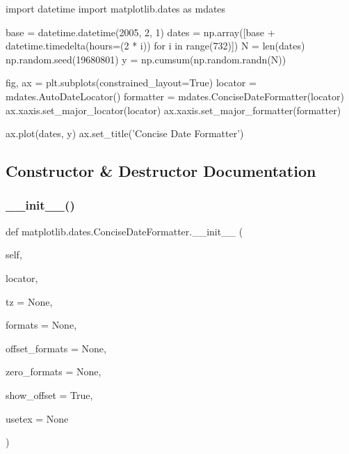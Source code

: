 \begin{DoxyVerb}
    import datetime
    import matplotlib.dates as mdates

    base = datetime.datetime(2005, 2, 1)
    dates = np.array([base + datetime.timedelta(hours=(2 * i))
                      for i in range(732)])
    N = len(dates)
    np.random.seed(19680801)
    y = np.cumsum(np.random.randn(N))

    fig, ax = plt.subplots(constrained_layout=True)
    locator = mdates.AutoDateLocator()
    formatter = mdates.ConciseDateFormatter(locator)
    ax.xaxis.set_major_locator(locator)
    ax.xaxis.set_major_formatter(formatter)

    ax.plot(dates, y)
    ax.set_title('Concise Date Formatter')\end{DoxyVerb}
 

\subsection{Constructor \& Destructor Documentation}
\mbox{\label{classmatplotlib_1_1dates_1_1ConciseDateFormatter_adb5b715bcae62cfa81c66975a3144351}} 
\subsubsection{\texorpdfstring{\+\_\+\+\_\+init\+\_\+\+\_\+()}{\_\_init\_\_()}}
{\footnotesize\ttfamily def matplotlib.\+dates.\+Concise\+Date\+Formatter.\+\_\+\+\_\+init\+\_\+\+\_\+ (\begin{DoxyParamCaption}\item[{}]{self,  }\item[{}]{locator,  }\item[{}]{tz = {\ttfamily None},  }\item[{}]{formats = {\ttfamily None},  }\item[{}]{offset\+\_\+formats = {\ttfamily None},  }\item[{}]{zero\+\_\+formats = {\ttfamily None},  }\item[{}]{show\+\_\+offset = {\ttfamily True},  }\item[{}]{usetex = {\ttfamily None} }\end{DoxyParamCaption})}

